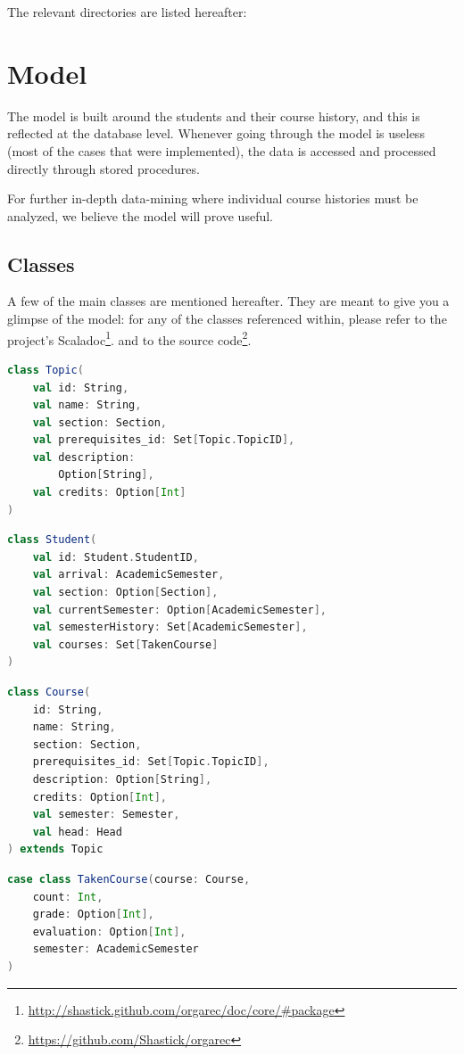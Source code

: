 The relevant directories are listed hereafter:


\chapter{Model}
The model is built around the students and their course history, and this is reflected at the database level. Whenever going through the model is useless (most of the cases that were implemented), the data is accessed and processed directly through stored procedures.

For further in-depth data-mining where individual course histories must be analyzed, we believe the model will prove useful.

\section{Classes}
A few of the main classes are mentioned hereafter. They are meant to give you a glimpse of the model: for any of the classes referenced within, please refer to the project's Scaladoc\footnote{\url{http://shastick.github.com/orgarec/doc/core/\#package}}.
and to the source code\footnote{\url{https://github.com/Shastick/orgarec}}.
\begin{multicols}{2}
\begin{lstlisting}[language=Scala]
class Topic(
    val id: String,
    val name: String,
    val section: Section,
    val prerequisites_id: Set[Topic.TopicID],
    val description: 
    	Option[String],
    val credits: Option[Int]
)
\end{lstlisting}

\begin{lstlisting}[language=Scala]
class Student(
    val id: Student.StudentID,
    val arrival: AcademicSemester,
    val section: Option[Section],
    val currentSemester: Option[AcademicSemester],
    val semesterHistory: Set[AcademicSemester],
    val courses: Set[TakenCourse]   
)
\end{lstlisting}

\columnbreak
\begin{lstlisting}[language=Scala]
class Course(
    id: String,
    name: String,
    section: Section,
    prerequisites_id: Set[Topic.TopicID],
    description: Option[String],
    credits: Option[Int],
    val semester: Semester,
    val head: Head
) extends Topic
\end{lstlisting}
\begin{lstlisting}[language=Scala]
case class TakenCourse(course: Course,
    count: Int,
    grade: Option[Int],
    evaluation: Option[Int],
    semester: AcademicSemester
)
\end{lstlisting}

\end{multicols}

